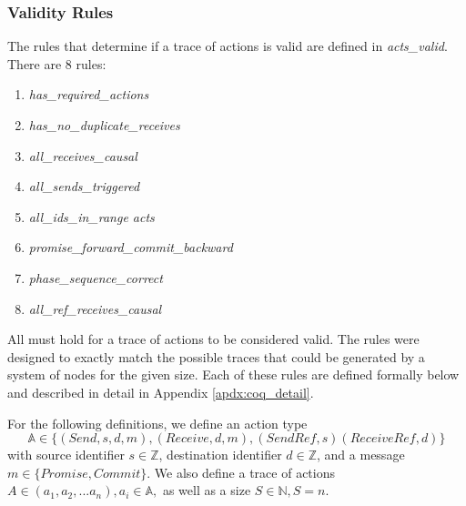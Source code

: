 \documentclass[runningheads]{llncs}
\newcommand{\action}{\mathds{A}}
\begin{document}
\subsubsection{Validity Rules} \label{sec:validity_rules}
The rules that determine if a trace of actions is valid are defined in \emph{acts\_valid}. There are 8 rules:

\begin{enumerate}
  \itemsep 0pt
  \item \emph{has\_required\_actions}
  \item \emph{has\_no\_duplicate\_receives}
  \item \emph{all\_receives\_causal}
  \item \emph{all\_sends\_triggered}
  \item \emph{all\_ids\_in\_range acts}
  \item \emph{promise\_forward\_commit\_backward}
  \item \emph{phase\_sequence\_correct}
  \item \emph{all\_ref\_receives\_causal}
\end{enumerate}

All must hold for a trace of actions to be considered valid. The rules were designed to exactly match the possible traces that could be generated by a system of nodes for the given size. Each of these rules are defined formally below and described in detail in Appendix \ref{apdx:coq_detail}.

For the following definitions, we define an action type 
$$\action \in \{(Send, s, d, m), (Receive, d, m), (SendRef, s) (ReceiveRef, d)\}$$
with source identifier $s \in \mathds{Z}$, destination identifier $d \in \mathds{Z}$, and a message $m \in \{Promise, Commit\}$. We also define a trace of actions 
$A \in (a_1, a_2, ... a_n), a_i \in \action,$ as well as a size $S \in \mathds{N}, S = n.$
\end{document}
